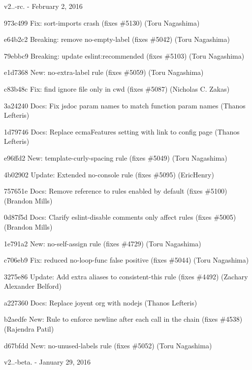 v2..-\/rc. -\/ February 2, 2016


\begin{DoxyItemize}
\item 973c499 Fix\+: {\ttfamily sort-\/imports} crash (fixes \#5130) (Toru Nagashima)
\item e64b2c2 Breaking\+: remove {\ttfamily no-\/empty-\/label} (fixes \#5042) (Toru Nagashima)
\item 79ebbc9 Breaking\+: update {\ttfamily eslint\+:recommended} (fixes \#5103) (Toru Nagashima)
\item e1d7368 New\+: {\ttfamily no-\/extra-\/label} rule (fixes \#5059) (Toru Nagashima)
\item c83b48c Fix\+: find ignore file only in cwd (fixes \#5087) (Nicholas C. Zakas)
\item 3a24240 Docs\+: Fix jsdoc param names to match function param names (Thanos Lefteris)
\item 1d79746 Docs\+: Replace ecma\+Features setting with link to config page (Thanos Lefteris)
\item e96ffd2 New\+: {\ttfamily template-\/curly-\/spacing} rule (fixes \#5049) (Toru Nagashima)
\item 4b02902 Update\+: Extended no-\/console rule (fixes \#5095) (Eric\+Henry)
\item 757651e Docs\+: Remove reference to rules enabled by default (fixes \#5100) (Brandon Mills)
\item 0d87f5d Docs\+: Clarify eslint-\/disable comments only affect rules (fixes \#5005) (Brandon Mills)
\item 1e791a2 New\+: {\ttfamily no-\/self-\/assign} rule (fixes \#4729) (Toru Nagashima)
\item c706eb9 Fix\+: reduced {\ttfamily no-\/loop-\/func} false positive (fixes \#5044) (Toru Nagashima)
\item 3275e86 Update\+: Add extra aliases to consistent-\/this rule (fixes \#4492) (Zachary Alexander Belford)
\item a227360 Docs\+: Replace joyent org with nodejs (Thanos Lefteris)
\item b2aedfe New\+: Rule to enforce newline after each call in the chain (fixes \#4538) (Rajendra Patil)
\item d67bfdd New\+: {\ttfamily no-\/unused-\/labels} rule (fixes \#5052) (Toru Nagashima)
\end{DoxyItemize}

v2..-\/beta. -\/ January 29, 2016


